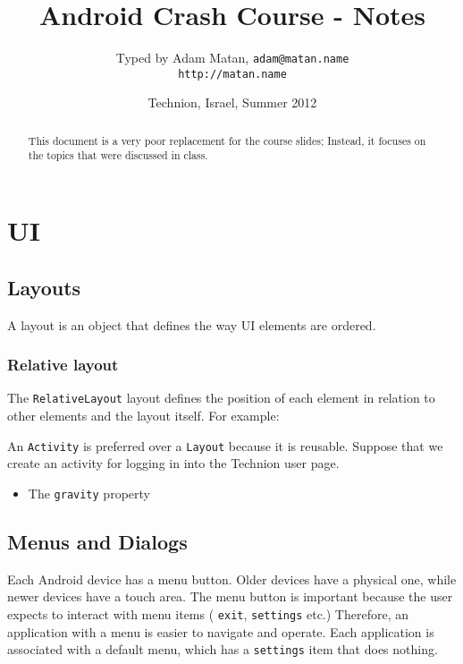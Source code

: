 \documentclass{article}
\begin{document}
\title{Android Crash Course - Notes}
\author{Typed by Adam Matan, \texttt{adam@matan.name} \\
\texttt{http://matan.name}}
\date{Technion, Israel, Summer 2012}

\maketitle

\begin{abstract}
This document is a very poor replacement for the course slides; Instead, it focuses on the topics that were discussed in class.
\end{abstract}


\section{UI}
\subsection{Layouts}
A layout is an object that defines the way UI elements are ordered.

\subsubsection{Relative layout}

The \texttt{RelativeLayout} layout defines the position of each element in relation to other elements and the layout itself. For example:

An \texttt{Activity} is preferred over a \texttt{Layout} because it is reusable. Suppose that we create an activity for logging in into the Technion user page. 

\begin{itemize}
\item The \texttt{gravity} property
\end{itemize}

\subsection{Menus and Dialogs}

Each Android device has a menu button. Older devices have a physical one, while newer devices have a touch area. The menu button is important because the user expects to interact with menu items ( \texttt{exit},  \texttt{settings} etc.) Therefore, an application with a menu is easier to navigate and operate. Each application is associated with a default menu, which has a \texttt{settings} item that does nothing.
\end{document}
